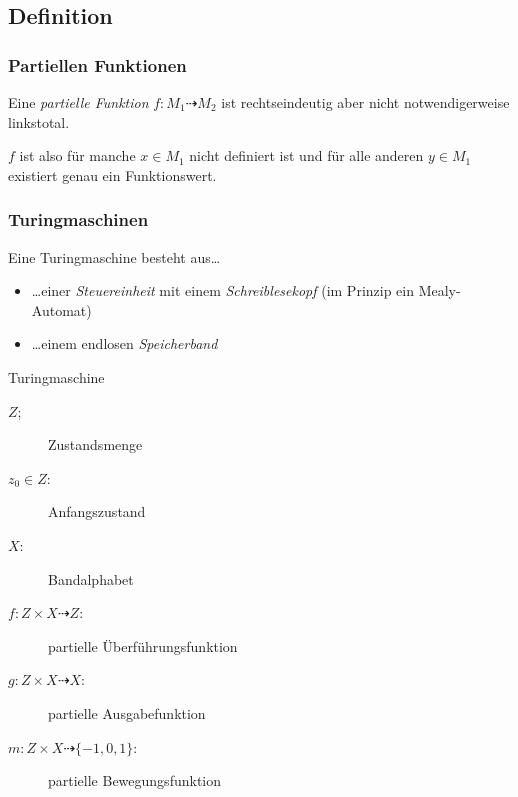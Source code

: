 \subsection{Definition}
\begin{frame}
	\frametitle{Partiellen Funktionen}
  \begin{definition}
	Eine \emph{partielle Funktion} $f: M_1 \dashrightarrow M_2$ ist rechtseindeutig aber nicht notwendigerweise linkstotal.\\
  \end{definition}
	$f$ ist also für manche $x\in M_1$ nicht definiert ist und für alle anderen $y\in M_1$ existiert genau ein Funktionswert.
\end{frame}
\begin{frame}
	\frametitle{Turingmaschinen}
	\begin{block}{Eine Turingmaschine besteht aus\dots}
		\begin{itemize}
			\item \dots einer \emph{Steuereinheit} mit einem \emph{Schreiblesekopf} (im Prinzip ein Mealy-Automat)
			\item \dots einem endlosen \emph{Speicherband}
		\end{itemize}
	\end{block}
	\pause
	\begin{block}{Turingmaschine}
		\begin{description}
			\item[$Z$;] Zustandsmenge
			\item[$z_0\in Z$:] Anfangszustand
			\item[$X$:] Bandalphabet
			\item[$f:Z\times X\dashrightarrow Z$:] partielle Überführungsfunktion
			\item[$g:Z\times X\dashrightarrow X$:] partielle Ausgabefunktion
			\item[$m:Z\times X\dashrightarrow \{-1,0,1\}$:] partielle Bewegungsfunktion
		\end{description}
	\end{block}
\end{frame}

